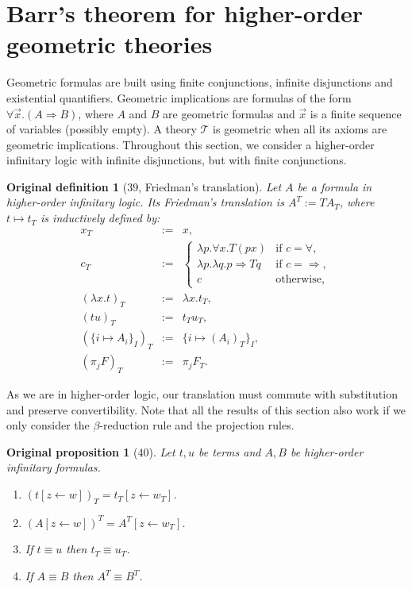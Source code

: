 \documentclass[10pt,a4paper]{article}
\newtheorem*{authordef}{Original definition}
\newtheorem*{authorprop}{Original proposition}
\begin{document}
\section*{Barr's theorem for higher-order geometric theories}
Geometric formulas are built using finite conjunctions, infinite disjunctions and existential quantifiers. Geometric implications are formulas of the form $\forall\vec x.(A\Rightarrow B)$, where $A$ and $B$ are geometric formulas and $\vec x$ is a finite sequence of variables (possibly empty). A theory $\mathcal T$ is geometric when all its axioms are geometric implications. Throughout this section, we consider a higher-order infinitary logic with infinite disjunctions, but with finite conjunctions.
\begin{authordef}[39, Friedman's translation]
Let $A$ be a formula in higher-order infinitary logic. Its Friedman's translation is $A^T:=TA_T$, where $t\mapsto t_T$ is inductively defined by:
\[\begin{array}{rcl}x_T&:=&x,\\c_T&:=&\begin{cases}\lambda p.\forall x.T(px)&\text{if }c=\forall,\\\lambda p.\lambda q.p\Rightarrow Tq&\text{if }c=\Rightarrow,\\c&\text{otherwise},\end{cases}\\(\lambda x.t)_T&:=&\lambda x.t_T,\\(tu)_T&:=&t_Tu_T,\\(\{i\mapsto A_i\}_I)_T&:=&\{i\mapsto(A_i)_T\}_I,\\(\pi_jF)_T&:=&\pi_jF_T.\end{array}\]
\end{authordef}
As we are in higher-order logic, our translation must commute with substitution and preserve convertibility. Note that all the results of this section also work if we only consider the $\beta$-reduction rule and the projection rules.
\begin{authorprop}[40]
Let $t,u$ be terms and $A,B$ be higher-order infinitary formulas.
\begin{enumerate}\item $(t[z\leftarrow w])_T=t_T[z\leftarrow w_T]$.\item $(A[z\leftarrow w])^T=A^T[z\leftarrow w_T]$.\item If $t\equiv u$ then $t_T\equiv u_T$.\item If $A\equiv B$ then $A^T\equiv B^T$.\end{enumerate}
\end{authorprop}
\end{document}
